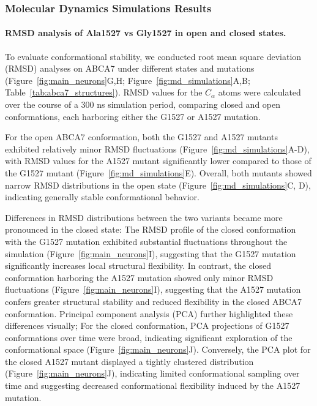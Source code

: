 \documentclass[12pt]{article}
\begin{document}
\subsubsection{Molecular Dynamics Simulations Results} 
\paragraph{RMSD analysis of Ala1527 vs Gly1527 in open and closed states.}
To evaluate conformational stability, we conducted root mean square deviation (RMSD) analyses on ABCA7 under different states and mutations (Figure~\ref{fig:main_neurons}G,H; Figure~\ref{fig:md_simulations}A,B; Table~\ref{tab:abca7_structures}). RMSD values for the $C_\alpha$ atoms were calculated over the course of a 300 ns simulation period, comparing closed and open conformations, each harboring either the G1527 or A1527 mutation.

For the open ABCA7 conformation, both the G1527 and A1527 mutants exhibited relatively minor RMSD fluctuations (Figure~\ref{fig:md_simulations}A-D), with RMSD values for the A1527 mutant significantly lower compared to those of the G1527 mutant (Figure~\ref{fig:md_simulations}E). Overall, both mutants showed narrow RMSD distributions in the open state (Figure~\ref{fig:md_simulations}C, D), indicating generally stable conformational behavior. 

Differences in RMSD distributions between the two variants became more pronounced in the closed state: The RMSD profile of the closed conformation with the G1527 mutation exhibited substantial fluctuations throughout the simulation (Figure~\ref{fig:main_neurons}I), suggesting that the G1527 mutation significantly increases local structural flexibility. In contrast, the closed conformation harboring the A1527 mutation showed only minor RMSD fluctuations (Figure~\ref{fig:main_neurons}I), suggesting that the A1527 mutation confers greater structural stability and reduced flexibility in the closed ABCA7 conformation. Principal component analysis (PCA) further highlighted these differences visually; For the closed conformation, PCA projections of G1527 conformations over time were broad, indicating significant exploration of the conformational space (Figure~\ref{fig:main_neurons}J). Conversely, the PCA plot for the closed A1527 mutant displayed a tightly clustered distribution (Figure~\ref{fig:main_neurons}J), indicating limited conformational sampling over time and suggesting decreased conformational flexibility induced by the A1527 mutation.
\end{document}
